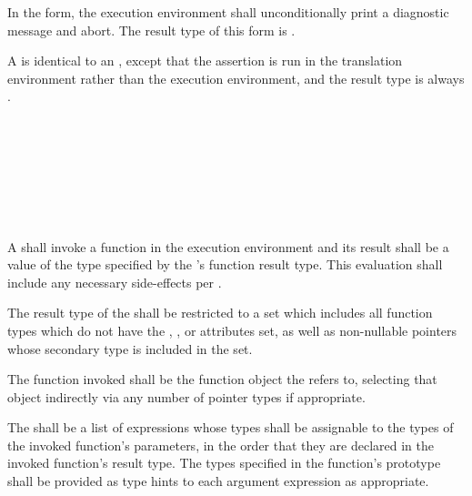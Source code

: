 \specsubsubitem
In the  form, the execution environment shall unconditionally
print a diagnostic message and abort. The result type of this form is
.

\specsubsubitem
A  is identical to an
, except that the assertion is run in the
translation environment rather than the execution environment, and the result
type is always .


\begin{grammar}
 \\
	 \terminal{(}  \terminal{)} \\

 \\
	 \optional{\terminal{,}} \\
	  \\
	 \terminal{,}  \\
\end{grammar}

\specsubsubitem
A  shall invoke a function in the execution
environment and its result shall be a value of the type specified by the
's function result type. This evaluation shall
include any necessary side-effects per .

\specsubsubitem
The result type of the  shall be restricted to a
set which includes all function types which do not have the ,
, or  attributes set, as well as non-nullable
pointers whose secondary type is included in the set.


\specsubsubitem
The function invoked shall be the function object the
 refers to, selecting that object indirectly via
any number of pointer types if appropriate.

\specsubsubitem
The  shall be a list of expressions whose types
shall be assignable to the types of the invoked function's parameters, in the
order that they are declared in the invoked function's result type. The types
specified in the function's prototype shall be provided as type hints to each
argument expression as appropriate.

